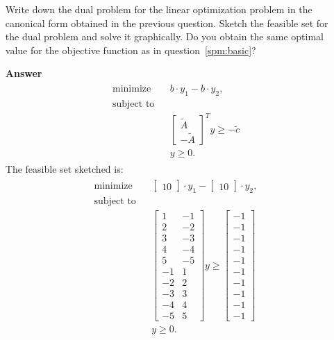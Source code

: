 \documentclass[10pt,a4paper]{article}
\theoremstyle{plain}
\theoremstyle{definition}
\begin{document}
\begin{enumerate}
Write down the dual problem for the linear optimization problem in the canonical form obtained in the previous question.
Sketch the feasible set for the dual problem and solve it graphically.
Do you obtain the same optimal value for the objective function as in question~\ref{spm:basic}?
\item[\textbf{Answer}] 
\begin{align*}
  \begin{aligned}
    &\text{minimize} && b\cdot y_1-b \cdot y_2,\\
    &\text{subject to}&&\\
    &&&\begin{bmatrix}\tilde{A} \\ -\tilde{A}\end{bmatrix}^Ty \geq -\tilde{c}\\
    &&& y \geq 0.
  \end{aligned}
\end{align*}
The feasible set sketched is:
\begin{align*}
  \begin{aligned}
    &\text{minimize} && \begin{bmatrix}10\end{bmatrix} \cdot y_1-\begin{bmatrix}10\end{bmatrix}  \cdot y_2,\\
    &\text{subject to}&&\\
    &&& \begin{bmatrix}
      1 & -1 \\ 2 & -2 \\ 3 & -3 \\ 4 & -4 \\ 5 & -5 \\ -1 & 1 \\ -2 & 2 \\ -3 & 3 \\ -4 & 4 \\ -5 & 5
    \end{bmatrix}y \geq \begin{bmatrix}
      -1 \\-1 \\-1 \\-1 \\-1 \\-1 \\-1 \\-1 \\-1 \\-1
    \end{bmatrix} \\
    &&& y \geq 0.
  \end{aligned}
\end{align*}


\end{enumerate}
\end{document}
